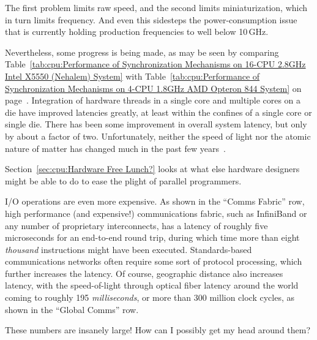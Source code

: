 {	The first problem limits raw speed, and the second limits
	miniaturization, which in turn limits frequency.
	And even this sidesteps the power-consumption issue that
	is currently holding production frequencies to well below
	10\,GHz.

	Nevertheless, some progress is being made, as may be seen
	by comparing
	Table~\ref{tab:cpu:Performance of Synchronization Mechanisms on 16-CPU 2.8GHz Intel X5550 (Nehalem) System}
	with
	Table~\ref{tab:cpu:Performance of Synchronization Mechanisms on 4-CPU 1.8GHz AMD Opteron 844 System}
	on
	page~\pageref{tab:cpu:Performance of Synchronization Mechanisms on 4-CPU 1.8GHz AMD Opteron 844 System}.
	Integration of hardware threads in a single core and multiple
	cores on a die have improved latencies greatly, at least within the
	confines of a single core or single die.
	There has been some improvement in overall system latency,
	but only by about a factor of two.
	Unfortunately, neither the speed of light nor the atomic nature
	of matter has changed much in the past few
	years~\cite{NoBugsHare2016CPUoperations}.

	Section~\ref{sec:cpu:Hardware Free Lunch?}
	looks at what else hardware designers might be
	able to do to ease the plight of parallel programmers.
} \QuickQuizEnd

I/O operations are even more expensive.
As shown in the ``Comms Fabric'' row,
high performance (and expensive!) communications fabric, such as
InfiniBand or any number of proprietary interconnects, has a latency
of roughly five microseconds for an end-to-end round trip, during which
time more than eight \emph{thousand} instructions might have been executed.
Standards-based communications networks often require some sort of
protocol processing, which further increases the latency.
Of course, geographic distance also increases latency, with the
speed-of-light through optical fiber latency around the world coming to
roughly 195 \emph{milliseconds}, or more than 300 million clock
cycles, as shown in the ``Global Comms'' row.


\QuickQuiz{}
	These numbers are insanely large!
	How can I possibly get my head around them?
 \QuickQuizEnd

